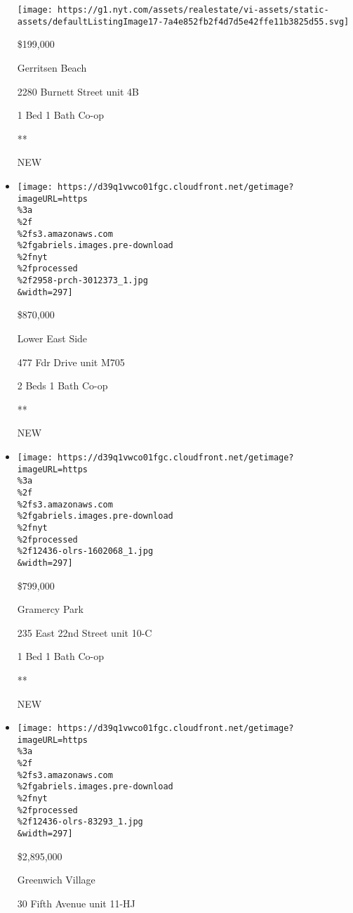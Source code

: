 \begin{itemize}
  \texttt{[image: https://g1.nyt.com/assets/realestate/vi-assets/static-assets/defaultListingImage17-7a4e852fb2f4d7d5e42ffe11b3825d55.svg]}

  \$199,000

  Gerritsen Beach

  2280 Burnett Street unit 4B

  1 Bed \textbar{} 1 Bath \textbar{} Co-op

  **

  NEW
\item
  \href{/real-estate/usa/ny/new-york/lower-east-side/homes-for-sale/477-fdr-drive/2958-PRCH-3012373?}{}

  \texttt{[image: https://d39q1vwco01fgc.cloudfront.net/getimage?imageURL=https\\\%3a\\\%2f\\\%2fs3.amazonaws.com\\\%2fgabriels.images.pre-download\\\%2fnyt\\\%2fprocessed\\\%2f2958-prch-3012373\_1.jpg\\\&width=297]}

  \$870,000

  Lower East Side

  477 Fdr Drive unit M705

  2 Beds \textbar{} 1 Bath \textbar{} Co-op

  **

  NEW
\item
  \href{/real-estate/usa/ny/new-york/gramercy-park/homes-for-sale/235-east-22nd-street/12436-OLRS-1602068?}{}

  \texttt{[image: https://d39q1vwco01fgc.cloudfront.net/getimage?imageURL=https\\\%3a\\\%2f\\\%2fs3.amazonaws.com\\\%2fgabriels.images.pre-download\\\%2fnyt\\\%2fprocessed\\\%2f12436-olrs-1602068\_1.jpg\\\&width=297]}

  \$799,000

  Gramercy Park

  235 East 22nd Street unit 10-C

  1 Bed \textbar{} 1 Bath \textbar{} Co-op

  **

  NEW
\item
  \href{/real-estate/usa/ny/new-york/greenwich-village/homes-for-sale/30-fifth-avenue/12436-OLRS-83293?}{}

  \texttt{[image: https://d39q1vwco01fgc.cloudfront.net/getimage?imageURL=https\\\%3a\\\%2f\\\%2fs3.amazonaws.com\\\%2fgabriels.images.pre-download\\\%2fnyt\\\%2fprocessed\\\%2f12436-olrs-83293\_1.jpg\\\&width=297]}

  \$2,895,000

  Greenwich Village

  30 Fifth Avenue unit 11-HJ


\end{itemize}
